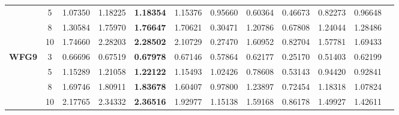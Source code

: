 \documentclass{sig-alternate}
\begin{document}
\begin{table}[!htb]
\begin{tabular}{|c|c|c|c|c|c|c|c|c|c|c|c|}
& 5          & 1.07350          & 1.18225           & \textbf{1.18354}      & 1.15376          & 0.95660             & 0.60364             & 0.46673            & 0.82273              & 0.96648          \\ \cline{2-11} 
& 8          & 1.30584          & 1.75970           & \textbf{1.76647}      & 1.70621          & 0.30471             & 1.20786             & 0.67808            & 1.24044              & 1.28486          \\ \cline{2-11} 
& 10         & 1.74660          & 2.28203           & \textbf{2.28502}      & 2.10729          & 0.27470             & 1.60952             & 0.82704            & 1.57781              & 1.69433          \\ \hline
\multirow{4}{*}{\textbf{WFG9}}  & 3          & 0.66696          & 0.67519           & \textbf{0.67978}      & 0.67146          & 0.57864             & 0.62177             & 0.25170            & 0.51403              & 0.62199          \\ \cline{2-11} 
& 5          & 1.15289          & 1.21058           & \textbf{1.22122}      & 1.15493          & 1.02426             & 0.78608             & 0.53143            & 0.94420              & 0.92841          \\ \cline{2-11} 
& 8          & 1.69746          & 1.80911           & \textbf{1.83678}      & 1.60407          & 0.97800             & 1.23897             & 0.72454            & 1.18318              & 1.07824          \\ \cline{2-11} 
& 10         & 2.17765          & 2.34332           & \textbf{2.36516}      & 1.92977          & 1.15138             & 1.59168             & 0.86178            & 1.49927              & 1.42611          \\ \hline
\end{tabular}
\end{table}
\end{document}
